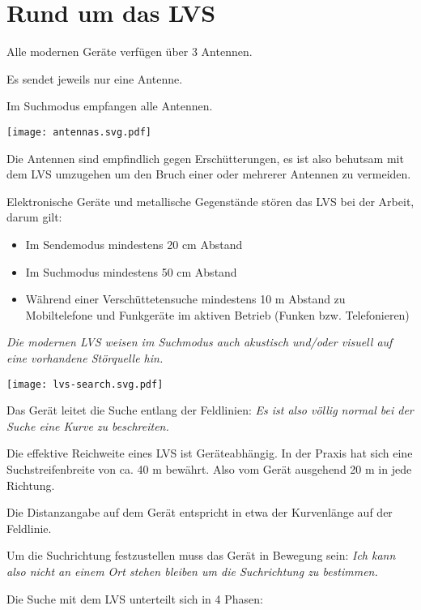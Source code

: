 \section{Rund um das LVS}

Alle modernen Geräte verfügen über 3 Antennen.

Es sendet jeweils nur eine Antenne.

Im Suchmodus empfangen alle Antennen.

\begin{center}
  \texttt{[image: antennas.svg.pdf]}
\end{center}

Die Antennen sind empfindlich gegen Erschütterungen, es ist also behutsam mit dem LVS umzugehen um den Bruch einer oder mehrerer Antennen zu vermeiden.

\newcolumn

Elektronische Geräte und metallische Gegenstände stören das LVS bei der Arbeit, darum gilt:

\begin{itemize}
  \item{Im Sendemodus mindestens 20 cm Abstand}
  \item{Im Suchmodus mindestens 50 cm Abstand}
  \item{Während einer Verschüttetensuche mindestens 10 m Abstand zu Mobiltelefone und Funkgeräte im aktiven Betrieb (Funken bzw. Telefonieren)}
\end{itemize}

\textit{Die modernen LVS weisen im Suchmodus auch akustisch und/oder visuell auf eine vorhandene Störquelle hin.}

\texttt{[image: lvs-search.svg.pdf]}

Das Gerät leitet die Suche entlang der Feldlinien: \textit{Es ist also völlig normal bei der Suche eine Kurve zu beschreiten.}

Die effektive Reichweite eines LVS ist Geräteabhängig. In der Praxis hat sich eine Suchstreifenbreite von ca. 40 m bewährt. Also vom Gerät ausgehend 20 m in jede Richtung.

Die Distanzangabe auf dem Gerät entspricht in etwa der Kurvenlänge auf der Feldlinie.

\newcolumn

Um die Suchrichtung festzustellen muss das Gerät in Bewegung sein: \textit{Ich kann also nicht an einem Ort stehen bleiben um die Suchrichtung zu bestimmen.}

Die Suche mit dem LVS unterteilt sich in 4 Phasen:

